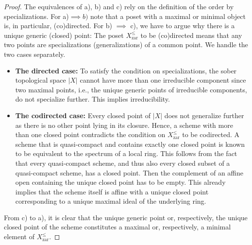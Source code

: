 \documentclass[10pt,a4paper]{amsart}
\newcommand{\Zpos}[1]{{#1}_{\zar}^{\leq}}
\DeclareMathOperator{\zar}{zar}
\begin{document}
\begin{proof}
The equivalences of a), b) and c) rely on the definition of the order by specializations.
For a)$\implies b)$ note that a poset with a maximal or minimal object is, in particular, (co)directed. For  b) $\implies$ c), we have to argue why there is a unique generic (closed) point:
The poset $ \Zpos{X}$ to be (co)directed means that any two points are specializations (generalizations) of a common point.
We handle the two cases separately.
\begin{itemize}
    \item[\textbf{1.}] \textbf{The directed case:}
    To satisfy the condition on specializations, the sober topological space $|X|$ cannot have more than one irreducible component since two maximal points, i.e., the unique generic points of irreducible components, do not specialize further.
    This implies irreducibility.
    \item[\textbf{2.}] \textbf{The codirected case:}
    Every closed point of $|X|$ does not generalize further as there is no other point lying in its closure. Hence, a scheme with more than one closed point contradicts the condition on $ \Zpos{X}$ to be codirected.
    A scheme that is quasi-compact and contains exactly one closed point is known to be equivalent to the spectrum of a local ring.
    This follows from the fact that every quasi-compact scheme, and thus also every closed subset of a quasi-compact scheme, has a closed point.
    Then the complement of an affine open containing the unique closed point has to be empty.
    This already implies that the scheme itself is affine with a unique closed point corresponding to a unique maximal ideal of the underlying ring.
    \end{itemize}
From c) to a), it is clear that the unique generic point or, respectively, the unique closed point of the scheme constitutes a maximal or, respectively, a minimal element of $ \Zpos{X}$.
\end{proof}
\end{document}
